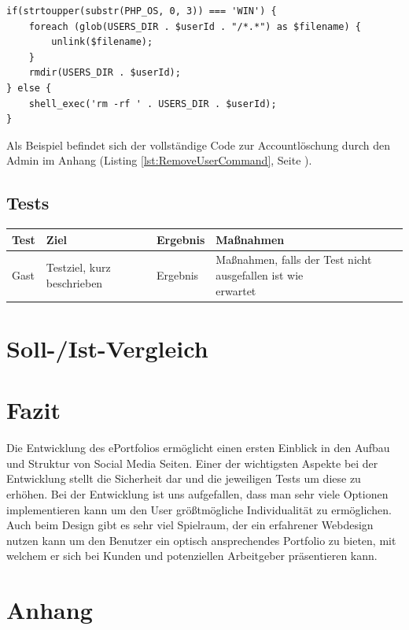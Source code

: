 \documentclass[10pt]{scrarticle}
\begin{document}
\lstset{firstnumber=31}
\begin{lstlisting}
if(strtoupper(substr(PHP_OS, 0, 3)) === 'WIN') {
    foreach (glob(USERS_DIR . $userId . "/*.*") as $filename) {
        unlink($filename);
    }
    rmdir(USERS_DIR . $userId);
} else {
    shell_exec('rm -rf ' . USERS_DIR . $userId);
}
\end{lstlisting}
Als Beispiel befindet sich der vollständige Code zur Accountlöschung durch den Admin im Anhang (Listing \ref{lst:RemoveUserCommand}, Seite \pageref{lst:RemoveUserCommand}).

\subsection{Tests}

\begin{table}[ht!]
\begin{tabularx}{\textwidth}{l | l | l | l}

\textbf{Test}  & \textbf{Ziel}  & \textbf{Ergebnis} & \textbf{Maßnahmen}\\
\hline
Gast  & Testziel, kurz beschrieben  & Ergebnis & \makecell[l]{Maßnahmen, falls der Test nicht ausgefallen ist wie \\ erwartet}\\

\end{tabularx}
\end{table}

\section{Soll-/Ist-Vergleich}
\section{Fazit}

Die Entwicklung des ePortfolios ermöglicht einen ersten Einblick in den Aufbau und Struktur von Social Media Seiten. Einer der wichtigsten Aspekte bei der Entwicklung stellt die Sicherheit dar und die jeweiligen Tests um diese zu erhöhen. Bei der Entwicklung ist uns aufgefallen, dass man sehr viele Optionen implementieren kann um den User größtmögliche Individualität zu ermöglichen. Auch beim Design gibt es sehr viel Spielraum, der ein erfahrener Webdesign nutzen kann um den Benutzer ein optisch ansprechendes Portfolio zu bieten, mit welchem er sich bei Kunden und potenziellen Arbeitgeber präsentieren kann.

\section{Anhang}
\end{document}
